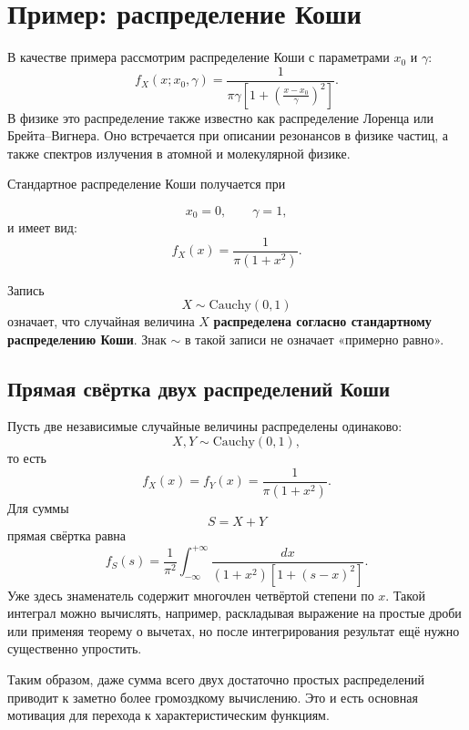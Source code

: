 \documentclass[
  russian,
  12pt,
  a4paper,
  a4paper,
  openany]{scrbook}
\begin{document}
\section{Пример: распределение
Коши}\label{ux43fux440ux438ux43cux435ux440-ux440ux430ux441ux43fux440ux435ux434ux435ux43bux435ux43dux438ux435-ux43aux43eux448ux438}

В качестве примера рассмотрим распределение Коши с параметрами \(x_0\) и
\(\gamma\): \[\boxed{
f_X(x;x_0,\gamma)
=
\frac{1}
{\pi\gamma\left[1+\left(\frac{x-x_0}{\gamma}\right)^2\right]}.
}\] В физике это распределение также известно как распределение Лоренца
или Брейта--Вигнера. Оно встречается при описании резонансов в физике
частиц, а также спектров излучения в атомной и молекулярной физике.

Стандартное распределение Коши получается при

\[x_0=0,
\qquad
\gamma=1,\] и имеет вид: \[\boxed{
f_X(x)=\frac{1}{\pi(1+x^2)}.
}\]

\begin{booknote}

Запись \[X\sim \mathrm{Cauchy}(0,1)\] означает, что случайная величина
\(X\) \textbf{распределена согласно стандартному распределению Коши}.
Знак \(\sim\) в такой записи не означает «примерно равно».

\end{booknote}

\subsection{Прямая свёртка двух распределений
Коши}\label{ux43fux440ux44fux43cux430ux44f-ux441ux432ux451ux440ux442ux43aux430-ux434ux432ux443ux445-ux440ux430ux441ux43fux440ux435ux434ux435ux43bux435ux43dux438ux439-ux43aux43eux448ux438}

Пусть две независимые случайные величины распределены одинаково:
\[X,Y\sim\mathrm{Cauchy}(0,1),\] то есть
\[f_X(x)=f_Y(x)=\frac{1}{\pi(1+x^2)}.\] Для суммы \[S=X+Y\] прямая
свёртка равна \[\boxed{
f_S(s)
=
\frac{1}{\pi^2}
\int_{-\infty}^{+\infty}
\frac{dx}
{(1+x^2)\left[1+(s-x)^2\right]}.
}\] Уже здесь знаменатель содержит многочлен четвёртой степени по \(x\).
Такой интеграл можно вычислять, например, раскладывая выражение на
простые дроби или применяя теорему о вычетах, но после интегрирования
результат ещё нужно существенно упростить.

Таким образом, даже сумма всего двух достаточно простых распределений
приводит к заметно более громоздкому вычислению. Это и есть основная
мотивация для перехода к характеристическим функциям.
\end{document}
